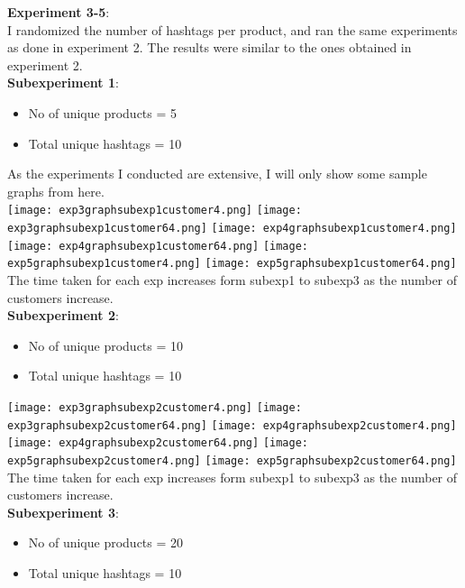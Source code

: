 \documentclass[12pt]{article}
\begin{document}
\textbf{Experiment 3-5}:\\
I randomized the number of hashtags per product, and ran the same experiments as done in experiment 2. The results were similar to the ones obtained in experiment 2.\\
\textbf{Subexperiment 1}:\\
\begin{itemize}
    \item No of unique products = 5
    \item Total unique hashtags = 10
\end{itemize}
As the experiments I conducted are extensive, I will only show some sample graphs from here.\\
\texttt{[image: exp3graphsubexp1customer4.png]}  
\texttt{[image: exp3graphsubexp1customer64.png]}
\texttt{[image: exp4graphsubexp1customer4.png]}  
\texttt{[image: exp4graphsubexp1customer64.png]}
\texttt{[image: exp5graphsubexp1customer4.png]}  
\texttt{[image: exp5graphsubexp1customer64.png]}\\

The time taken for each exp increases form subexp1 to subexp3 as the number of customers increase.\\

\textbf{Subexperiment 2}:\\
\begin{itemize}
    \item No of unique products = 10
    \item Total unique hashtags = 10
\end{itemize}

\texttt{[image: exp3graphsubexp2customer4.png]}
\texttt{[image: exp3graphsubexp2customer64.png]}
\texttt{[image: exp4graphsubexp2customer4.png]}
\texttt{[image: exp4graphsubexp2customer64.png]}
\texttt{[image: exp5graphsubexp2customer4.png]}
\texttt{[image: exp5graphsubexp2customer64.png]}\\

The time taken for each exp increases form subexp1 to subexp3 as the number of customers increase.\\

\textbf{Subexperiment 3}:\\
\begin{itemize}
    \item No of unique products = 20
    \item Total unique hashtags = 10
\end{itemize}
\end{document}

